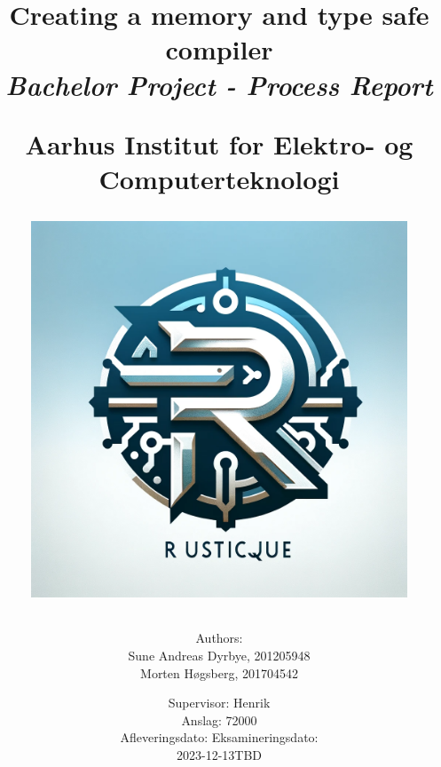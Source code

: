 \newcommand{\authorName}{}
\newcommand{\titleName}{Creating a memory and type safe compiler}
\newcommand{\subject}{Bachelor Project - Process Report}
\newcommand{\vejleder}{Supervisor: Henrik}
\newcommand{\institute}{Aarhus Institut for Elektro- og Computerteknologi}
\begin{titlepage}
  \centering
    \title
    {
      \Huge \textbf{\titleName}\\
      \scale{\numberSQRTTWO}{\vspace{\sol pt}}
      \LARGE \textit{\subject}
      \scale{\numberSQRTTWO}{\rule{\linewidth}{\sol pt}}

      \textbf{\institute}

      \begin{figure}[h]
        \centering
        \includegraphics[scale=0.21]{02-Body/Images/rusticqueLogo.png}
      \end{figure}

      \author
    {
      \LARGE Authors: \\
      Sune Andreas Dyrbye, 201205948 \\
      Morten Høgsberg, 201704542 \\
      }
           \date{
        \Large \vejleder \\
        Anslag: 72000\\
        \vspace{1em}
        Afleveringsdato: \hfill
        Eksamineringsdato:\\
        2023-12-13\hfill TBD
      }


    }
   
\end{titlepage}
